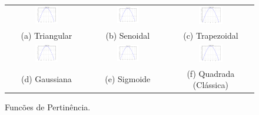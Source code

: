 \begin{figure}[H]
	\centering
\begin{tabular}{ccc}
	\includegraphics[width=0.3\textwidth,keepaspectratio]{img/pertSen.png} &
	\includegraphics[width=0.3\textwidth,keepaspectratio]{img/pertSen.png} &
	\includegraphics[width=0.3\textwidth,keepaspectratio]{img/pertSen.png} \\
	(a) Triangular &
	(b) Senoidal &
	(c) Trapezoidal \\
	\includegraphics[width=0.3\textwidth,keepaspectratio]{img/pertSen.png} &
	\includegraphics[width=0.3\textwidth,keepaspectratio]{img/pertSen.png} &
	\includegraphics[width=0.3\textwidth,keepaspectratio]{img/pertSen.png} \\
	(d) Gaussiana &
	(e) Sigmoide &
	(f) Quadrada (Clássica)
\end{tabular}
	\caption{\label{figPert}Funcões de Pertinência.}
\end{figure}

